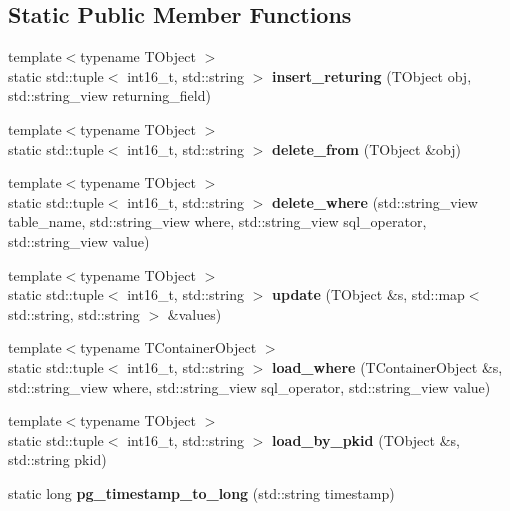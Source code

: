 \subsection*{Static Public Member Functions}
\begin{DoxyCompactItemize}
\item 
\mbox{\label{structmods_1_1orm_1_1base_a4af88a9e666484da8495034902354d8b}} 
{\footnotesize template$<$typename T\+Object $>$ }\\static std\+::tuple$<$ int16\+\_\+t, std\+::string $>$ {\bfseries insert\+\_\+returing} (T\+Object obj, std\+::string\+\_\+view returning\+\_\+field)
\item 
\mbox{\label{structmods_1_1orm_1_1base_a76c73cc22cd1ea2dc738281d9155e4c4}} 
{\footnotesize template$<$typename T\+Object $>$ }\\static std\+::tuple$<$ int16\+\_\+t, std\+::string $>$ {\bfseries delete\+\_\+from} (T\+Object \&obj)
\item 
\mbox{\label{structmods_1_1orm_1_1base_a04952a850097ec7ddfca0a94b51fe120}} 
{\footnotesize template$<$typename T\+Object $>$ }\\static std\+::tuple$<$ int16\+\_\+t, std\+::string $>$ {\bfseries delete\+\_\+where} (std\+::string\+\_\+view table\+\_\+name, std\+::string\+\_\+view where, std\+::string\+\_\+view sql\+\_\+operator, std\+::string\+\_\+view value)
\item 
\mbox{\label{structmods_1_1orm_1_1base_aa2113b305b253592658b0bc49229affa}} 
{\footnotesize template$<$typename T\+Object $>$ }\\static std\+::tuple$<$ int16\+\_\+t, std\+::string $>$ {\bfseries update} (T\+Object \&s, std\+::map$<$ std\+::string, std\+::string $>$ \&values)
\item 
\mbox{\label{structmods_1_1orm_1_1base_a79e2d79291cb9695a51cb238fd7fd42b}} 
{\footnotesize template$<$typename T\+Container\+Object $>$ }\\static std\+::tuple$<$ int16\+\_\+t, std\+::string $>$ {\bfseries load\+\_\+where} (T\+Container\+Object \&s, std\+::string\+\_\+view where, std\+::string\+\_\+view sql\+\_\+operator, std\+::string\+\_\+view value)
\item 
\mbox{\label{structmods_1_1orm_1_1base_aa92dbee5a2eb2be19d7107896871ac49}} 
{\footnotesize template$<$typename T\+Object $>$ }\\static std\+::tuple$<$ int16\+\_\+t, std\+::string $>$ {\bfseries load\+\_\+by\+\_\+pkid} (T\+Object \&s, std\+::string pkid)
\item 
\mbox{\label{structmods_1_1orm_1_1base_a2b811c8e961e32f3404f6a6e823bee3a}} 
static long {\bfseries pg\+\_\+timestamp\+\_\+to\+\_\+long} (std\+::string timestamp)
\end{DoxyCompactItemize}
